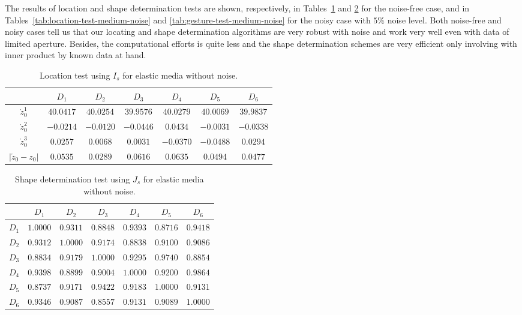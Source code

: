 \documentclass[a4paper,11pt]{article}
\theoremstyle{remark}
\theoremstyle{definition}
\numberwithin{equation}{section}
\begin{document}
The results of location and shape determination tests are shown, respectively, in Tables~\ref{tab:location-test-medium} and \ref{tab:gesture-test-medium} for the noise-free case,
and in Tables~\ref{tab:location-test-medium-noise} and \ref{tab:gesture-test-medium-noise} for the noisy case with $5\%$ noise level.
Both noise-free and noisy cases tell us that our locating and shape determination algorithms are very robust with noise and work very well even with data of limited aperture.
Besides, the computational efforts is quite less and the shape determination schemes are very efficient only involving with inner product by known data at hand.






\begin{table}
\hfill{}%
\begin{tabular}{|c|c|c|c|c|c|c|}
\hline
 & $D_{1}$ & $D_{2}$ & $D_{3}$ & $D_{4}$ & $D_{5}$ & $D_{6}$\tabularnewline
\hline
\hline
$\mathring{z}_{0}^{1}$ & $40.0417$ & $40.0254$ & $39.9576$ & $40.0279$ & $40.0069$ & $39.9837$\tabularnewline
\hline
$\mathring{z}_{0}^{2}$ & $-0.0214$ & $-0.0120$ & $-0.0446$ & $0.0434$ & $-0.0031$ & $-0.0338$\tabularnewline
\hline
$\mathring{z}_{0}^{3}$ & $0.0257$ & $0.0068$ & $0.0031$ & $-0.0370$ & $-0.0488$ & $0.0294$\tabularnewline
\hline
$\left|\mathring{z}_{0}-z_{0}\right|$ & $0.0535$ & $0.0289$ & $0.0616$ & $0.0635$ & $0.0494$ & $0.0477$\tabularnewline
\hline
\end{tabular}\hfill{}

\caption{\label{tab:location-test-medium}Location test using $I_{s}$  for elastic media without noise. }
\end{table}
\begin{table}
\hfill{}%
\begin{tabular}{|c|c|c|c|c|c|c|}
\hline
 & $D_{1}$ & $D_{2}$ & $D_{3}$ & $D_{4}$ & $D_{5}$ & $D_{6}$\tabularnewline
\hline
\hline
$D_{1}$ & $\boldsymbol{1.0000}$ & $0.9311$ & $0.8848$ & $0.9393$ & $0.8716$ & $0.9418$\tabularnewline
\hline
$D_{2}$ & $0.9312$ & $\boldsymbol{1.0000}$ & $0.9174$ & $0.8838$ & $0.9100$ & $0.9086$\tabularnewline
\hline
$D_{3}$ & $0.8834$ & $0.9179$ & $\boldsymbol{1.0000}$ & $0.9295$ & $0.9740$ & $0.8854$\tabularnewline
\hline
$D_{4}$ & $0.9398$ & $0.8899$ & $0.9004$ & $\boldsymbol{1.0000}$ & $0.9200$ & $0.9864$\tabularnewline
\hline
$D_{5}$ & $0.8737$ & $0.9171$ & $0.9422$ & $0.9183$ & $\boldsymbol{1.0000}$ & $0.9131$\tabularnewline
\hline
$D_{6}$ & $0.9346$ & $0.9087$ & $0.8557$ & $0.9131$ & $0.9089$ & $\boldsymbol{1.0000}$\tabularnewline
\hline
\end{tabular}\hfill{}

\caption{\label{tab:gesture-test-medium}Shape determination test using $J_{s}$  for elastic media without noise.}
\end{table}
\end{document}
